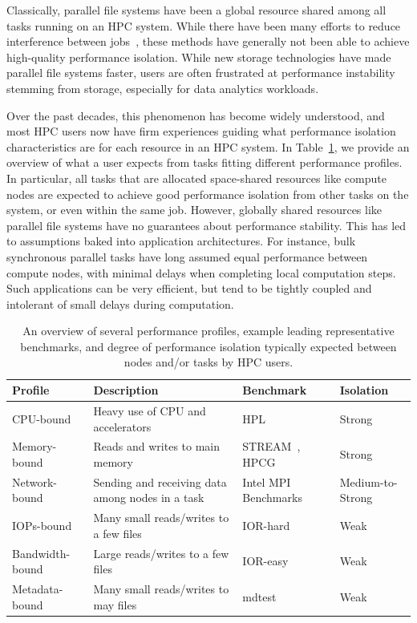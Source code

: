 Classically, parallel file systems have been a global resource shared among all tasks running on an HPC system. While there have been many efforts to reduce interference between jobs~\cite{10.1145/2063384.2063407,7573843}, these methods have generally not been able to achieve high-quality performance isolation. While new storage technologies have made parallel file systems faster, users are often frustrated at performance instability stemming from storage, especially for data analytics workloads.

Over the past decades, this phenomenon has become widely understood, and most HPC users now have firm experiences guiding what performance isolation characteristics are for each resource in an HPC system. In Table~\ref{Table:profiles}, we provide an overview of what a user expects from tasks fitting different performance profiles. In particular, all tasks that are allocated space-shared resources like compute nodes are expected to achieve good performance isolation from other tasks on the system, or even within the same job. However, globally shared resources like parallel file systems have no guarantees about performance stability. This has led to assumptions baked into application architectures. For instance, bulk synchronous parallel tasks have long assumed equal performance between compute nodes, with minimal delays when completing local computation steps. Such applications can be very efficient, but tend to be tightly coupled and intolerant of small delays during computation.

\begin{table}
  \caption{An overview of several performance profiles, example leading representative benchmarks, and degree of performance isolation typically expected between nodes and/or tasks by HPC users.}
  \label{Table:profiles}
  \begin{center}
\begin{tabular}{|l|l|l|l|}
\hline
{\bf Profile} & {\bf Description} & {\bf Benchmark} & {\bf Isolation} \\
\hline
CPU-bound & Heavy use of CPU and accelerators & HPL~\cite{hpl} & Strong\\
\hline
Memory-bound & Reads and writes to main memory & \raggedright STREAM~\cite{stream}, HPCG~\cite{hpcg} & Strong\\
\hline
Network-bound & Sending and receiving data among nodes in a task & \raggedright Intel MPI Benchmarks~\cite{imb} & Medium-to-Strong\\
\hline
IOPs-bound & Many small reads/writes to a few files & IOR-hard~\cite{io500} & Weak\\
\hline
Bandwidth-bound & Large reads/writes to a few files & IOR-easy~\cite{io500} & Weak\\
\hline
Metadata-bound & Many small reads/writes to may files & mdtest~\cite{ior} & Weak \\
\hline
\end{tabular}
\end{center}
\end{table}

